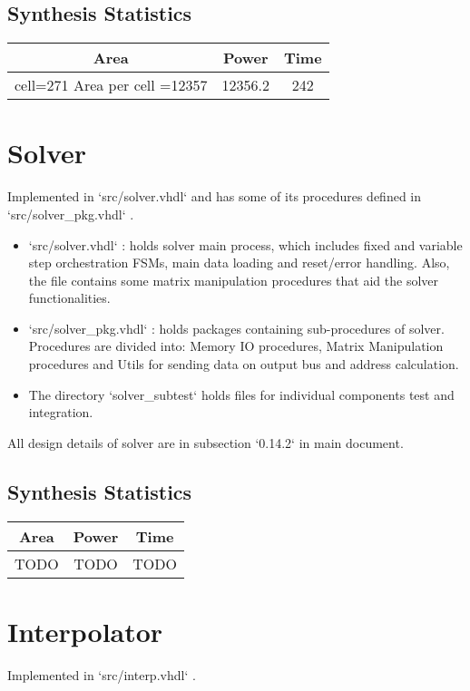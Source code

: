 \documentclass[12pt]{report}
\begin{document}
    \subsection{Synthesis Statistics}
    \begin{tabular}{||c|c|c||}
        \hline
        Area & Power & Time\\\hline\hline
        cell=271 Area per cell =12357 & 12356.2 & 242\\\hline
    \end{tabular}

    \section{Solver}
    Implemented in `src/solver.vhdl` and has some of its procedures defined in `src/solver\_pkg.vhdl` . 

    \begin{itemize}
        \item `src/solver.vhdl` : holds solver main process, which includes fixed and variable step orchestration FSMs, main data loading and reset/error handling. Also, the file contains some matrix manipulation procedures that aid the solver functionalities.
        \item `src/solver\_pkg.vhdl` : holds packages containing sub-procedures of solver. Procedures are divided into: Memory IO procedures, Matrix Manipulation procedures and Utils for sending data on output bus and address calculation.
        \item The directory `solver\_subtest` holds files for individual components test and integration.
    \end{itemize}

    All design details of solver are in subsection `0.14.2` in main document. 
    \subsection{Synthesis Statistics}
    \begin{tabular}{||c|c|c||}
        \hline
        Area & Power & Time\\\hline\hline
        TODO & TODO & TODO\\\hline
    \end{tabular}

    \section{Interpolator}
    Implemented in `src/interp.vhdl` . 
\end{document}
